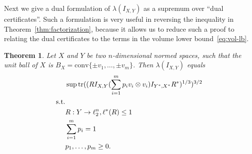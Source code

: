 \documentclass[12pt]{article}
\newtheorem{theorem}{Theorem}
\DeclareMathOperator{\tr}{tr}
\begin{document}
Next we give a dual formulation of $\lambda(I_{X,Y})$ as a
supremum over ``dual certificates''. Such a formulation is very useful
in reversing the inequality in Theorem~\ref{thm:factorization},
because it allows us to reduce such a proof to relating the dual
certificates to the terms in the volume lower bound~\eqref{eq:vol-lb}.

\begin{theorem}\label{thm:dual}
  Let $X$ and $Y$ be two $n$-dimensional normed
  spaces, such that the unit ball of $X$ is $B_X = \mathrm{conv}\{\pm
  v_1, \ldots, \pm v_m\}$. Then $\lambda(I_{X,Y})$ equals
  \begin{align}
    &\sup \tr((RI_{X,Y}(\sum_{i = 1}^m{p_i v_i \otimes  v_i})I_{Y^*,X^*}R^*)^{1/3})^{3/2}\label{eq:dual-obj}\\
    \text{s.t.}\notag\\
    &R: Y \to \ell_2^n, \ell^*(R) \le 1 \label{eq:dual-ellstar}\\
    &\sum_{i = 1}^m{p_i} = 1\label{eq:dual-prob}\\
    &p_1, \ldots, p_m \ge 0. \label{eq:dual-nonneg}
  \end{align}
\end{theorem}
\end{document}
